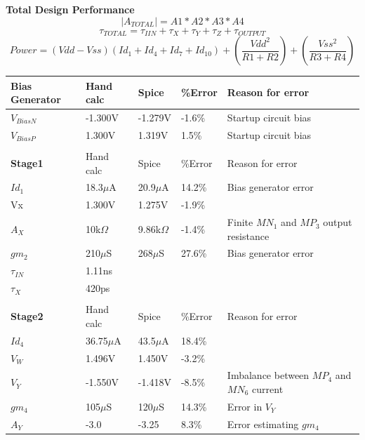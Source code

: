 \documentclass[12pt,a4paper]{article}
\begin{document}
\textbf{Total Design Performance}
\begin{equation}
	|A_{TOTAL}|=A1* A2* A3* A4
\end{equation}
\begin{equation}
	\tau_{TOTAL}=\tau_{IIN}+\tau_X+\tau_Y+\tau_Z+\tau_{OUTPUT}
\end{equation}
\begin{equation}
	Power=(Vdd-Vss)(Id_1+Id_4+Id_7+Id_{10})+(\frac{Vdd^{2}}{R1+R2})+(\frac{Vss^{2}}{R3+R4})
\end{equation}

\begin{table}[h]
\centering
\begin{tabular}{|l|l|l|l|l|}
\hline
\textbf{Bias Generator} & Hand calc & Spice & \%Error & Reason for error \\
\hline
$V_{BiasN}$ & -1.300V &  -1.279V &  -1.6\% &  Startup circuit bias \\
\hline
$V_{BiasP}$ & 1.300V &  1.319V & 1.5\%  &  Startup circuit bias \\
\hline
  &   &   &   &   \\
\hline
\textbf{Stage1} & Hand calc & Spice & \%Error & Reason for error \\
\hline
$Id_1$ & 18.3$\mu$A  &  20.9$\mu$A &  14.2\% &  Bias generator error \\
\hline
Vx & 1.300V  & 1.275V  & -1.9\%  &   \\
\hline
$A_X$ & 10k$\Omega$  & 9.86k$\Omega$  & -1.4\%  & Finite $MN_1$ and $MP_3$ output resistance  \\
\hline
$gm_2$ &  210$\mu$S & 268$\mu$S  & 27.6\%  & Bias generator error  \\
\hline
$\tau_{IN} $ & 1.11ns  &   &   &   \\
\hline
$\tau_X $ & 420ps  &   &   &   \\
\hline
  &   &   &   &   \\
\hline
\textbf{Stage2} & Hand calc & Spice & \%Error & Reason for error \\
\hline
$Id_4$ &  36.75$\mu$A & 43.5$\mu$A & 18.4\%  &   \\
\hline
$V_W$ & 1.496V & 1.450V  & -3.2\%  &   \\
\hline
$V_Y$ & -1.550V  & -1.418V  &  -8.5\% & Imbalance between $MP_4$ and $MN_6$ current \\
\hline
$gm_4$ & 105$\mu$S  &  120$\mu$S & 14.3\%  & Error in $V_Y$ \\
\hline
$A_Y$ & -3.0  & -3.25  & 8.3\%  & Error estimating $gm_4$  \\

\end{tabular}
\end{table}
\end{document}
